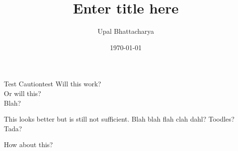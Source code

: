 \documentclass[a4paper]{article}
\author{Upal Bhattacharya}
\date{\today}
\title{Enter title here}
\begin{document}
\maketitle

\linenumbers

\begin{caution}{Test Caution}{test}
  Will this work? \\
  Or will this? \\
  Blah?
\end{caution}

This looks better but is still not sufficient. Blah blah flah clah dahl? Toodles? Tada?

How about this?
\end{document}
